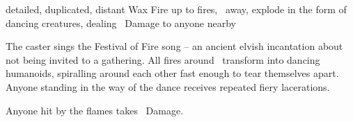   {detailed, duplicated, distant}%
  {Wax}%
  {Fire}%
  {}%
  {up to  fires, \spellRange\ away, explode in the form of dancing creatures, dealing \showDam\ Damage to anyone nearby}%
  {
    The caster sings the Festival of Fire song -- an ancient elvish incantation about not being invited to a gathering.
    All fires around \spellRange\ transform into dancing humanoids, spiralling around each other fast enough to tear themselves apart.
    Anyone standing in the way of the dance receives repeated fiery lacerations.

    Anyone hit by the flames takes \showDam\ Damage.
  }


